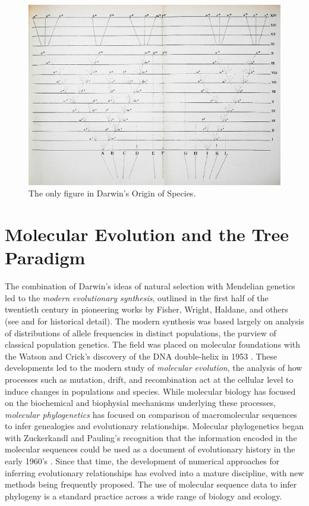 \begin{figure}
\centering
\includegraphics[width=.75\columnwidth]{./fig/introduction/Darwin_divergence.jpg}
\caption[Charles Darwin's Tree]{The only figure in Darwin's Origin of Species.}
\label{fig:darwin_origin}
\end{figure}

\section{Molecular Evolution and the Tree Paradigm}

The combination of Darwin's ideas of natural selection with Mendelian genetics led to the \emph{modern evolutionary synthesis}, outlined in the first half of the twentieth century in pioneering works by Fisher, Wright, Haldane, and others (see \cite{Huxley:1942} and \cite{Gould:2002ts} for historical detail).
The modern synthesis was based largely on analysis of distributions of allele frequencies in distinct populations, the purview of classical population genetics.
The field was placed on molecular foundations with the Watson and Crick's discovery of the DNA double-helix in 1953 \cite{Watson:1953wm}.
These developments led to the modern study of \emph{molecular evolution}, the analysis of how processes such as mutation, drift, and recombination act at the cellular level to induce changes in populations and species.
While molecular biology has focused on the biochemical and biophysial mechanisms underlying these processes, \emph{molecular phylogenetics} has focused on comparison of macromolecular sequences to infer genealogies and evolutionary relationships.
Molecular phylogenetics began with Zuckerkandl and Pauling's recognition that the information encoded in the molecular sequences could be used as a document of evolutionary history in the early 1960's \cite{Zuckerkandl:1962,Zuckerkandl:1965wi}.
Since that time, the development of numerical approaches for inferring evolutionary relationships has evolved into a mature discipline, with new methods being frequently proposed.
The use of molecular sequence data to infer phylogeny is a standard practice across a wide range of biology and ecology.

